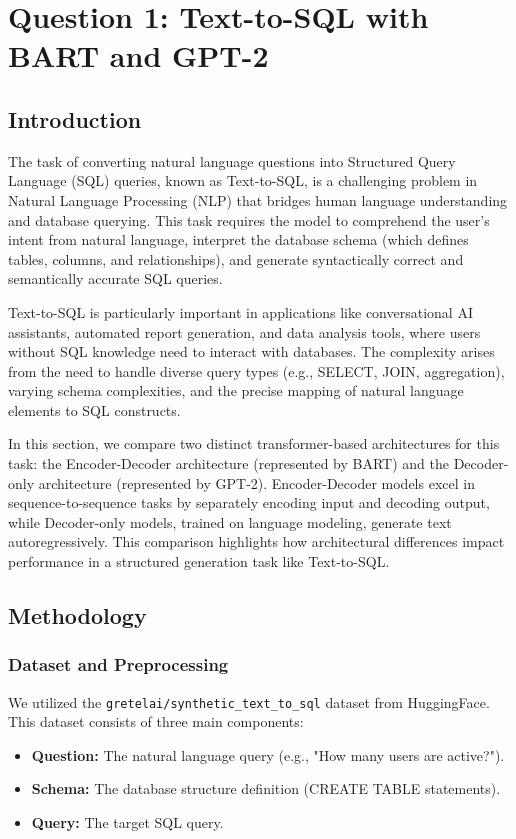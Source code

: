 \section{Question 1: Text-to-SQL with BART and GPT-2}

\subsection{Introduction}
The task of converting natural language questions into Structured Query Language (SQL) queries, known as Text-to-SQL, is a challenging problem in Natural Language Processing (NLP) that bridges human language understanding and database querying. This task requires the model to comprehend the user's intent from natural language, interpret the database schema (which defines tables, columns, and relationships), and generate syntactically correct and semantically accurate SQL queries.

Text-to-SQL is particularly important in applications like conversational AI assistants, automated report generation, and data analysis tools, where users without SQL knowledge need to interact with databases. The complexity arises from the need to handle diverse query types (e.g., SELECT, JOIN, aggregation), varying schema complexities, and the precise mapping of natural language elements to SQL constructs.

In this section, we compare two distinct transformer-based architectures for this task: the Encoder-Decoder architecture (represented by BART) and the Decoder-only architecture (represented by GPT-2). Encoder-Decoder models excel in sequence-to-sequence tasks by separately encoding input and decoding output, while Decoder-only models, trained on language modeling, generate text autoregressively. This comparison highlights how architectural differences impact performance in a structured generation task like Text-to-SQL.

\subsection{Methodology}

\subsubsection{Dataset and Preprocessing}
We utilized the \texttt{gretelai/synthetic\_text\_to\_sql} dataset from HuggingFace. This dataset consists of three main components:
\begin{itemize}
    \item \textbf{Question:} The natural language query (e.g., "How many users are active?").
    \item \textbf{Schema:} The database structure definition (CREATE TABLE statements).
    \item \textbf{Query:} The target SQL query.
\end{itemize}

